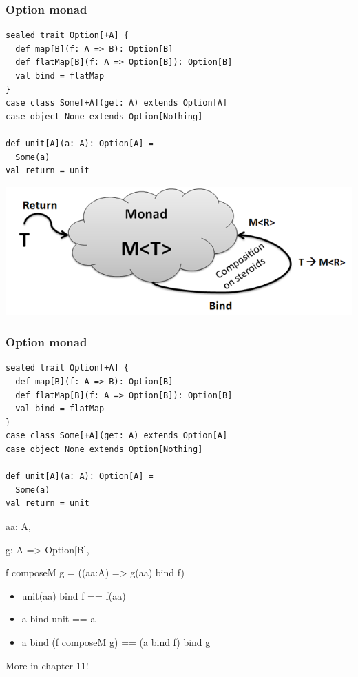 \documentclass{beamer}
\begin{document}
\begin{frame}[fragile,t]
  \frametitle{{\ttfamily Option} monad}
\begin{lstlisting}
sealed trait Option[+A] {
  def map[B](f: A => B): Option[B]
  def flatMap[B](f: A => Option[B]): Option[B]
  val bind = flatMap
}
case class Some[+A](get: A) extends Option[A]
case object None extends Option[Nothing]

def unit[A](a: A): Option[A] =
  Some(a)
val return = unit
\end{lstlisting}
\begin{center}
\includegraphics[scale=.35]{monad.png}
\end{center}
\end{frame}

\begin{frame}[fragile,t]
  \frametitle{{\ttfamily Option} monad}
\begin{lstlisting}
sealed trait Option[+A] {
  def map[B](f: A => B): Option[B]
  def flatMap[B](f: A => Option[B]): Option[B]
  val bind = flatMap
}
case class Some[+A](get: A) extends Option[A]
case object None extends Option[Nothing]

def unit[A](a: A): Option[A] =
  Some(a)
val return = unit
\end{lstlisting}
{\ttfamily aa: A},

{\ttfamily g: A => Option[B]},

{\ttfamily f composeM g = ((aa:A) => g(aa) bind f)}

\begin{itemize}
  \item {\ttfamily unit(aa) bind f == f(aa)}

  \item {\ttfamily a bind unit == a}

  \item {\ttfamily a bind (f composeM g) == (a bind f) bind g}
\end{itemize}
More in chapter 11!
\end{frame}
\end{document}
